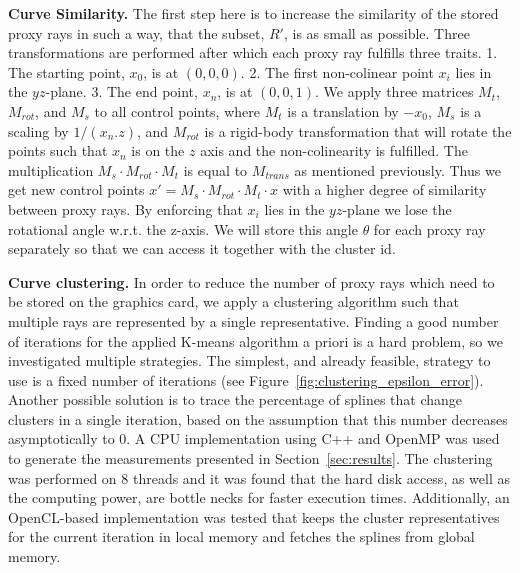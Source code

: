 \documentclass[journal]{vgtc}                %
\begin{document}
\noindent \textbf{Curve Similarity.} The first step here is to increase the similarity of the stored proxy rays in such a way, that the subset, $R'$, is as small as possible. Three transformations are performed after which each proxy ray fulfills three traits. 1. The starting point, $x_0$, is at $(0,0,0)$. 2. The first non-colinear point $x_i$ lies in the $yz$-plane. 3. The end point, $x_n$, is at $(0,0,1)$. We apply three matrices $M_t$, $M_{rot}$, and $M_s$ to all control points, where $M_t$ is a translation by $-x_0$, $M_s$ is a scaling by $1 / (x_n.z)$, and $M_{rot}$ is a rigid-body transformation that will rotate the points such that $x_n$ is on the $z$ axis and the non-colinearity is fulfilled. The multiplication $M_s \cdot M_{rot} \cdot M_t$ is equal to $M_{trans}$ as mentioned previously. Thus we get new control points $x' = M_s \cdot M_{rot} \cdot M_t \cdot x$ with a higher degree of similarity between proxy rays. By enforcing that $x_i$ lies in the $yz$-plane we lose the rotational angle w.r.t. the z-axis. We will store this angle $\theta$ for each proxy ray separately so that we can access it together with the cluster id.

\noindent \textbf{Curve clustering.} In order to reduce the number of proxy rays which need to be stored on the graphics card, we apply a clustering algorithm such that multiple rays are represented by a single representative. Finding a good number of iterations for the applied K-means algorithm a priori is a hard problem, so we investigated multiple strategies. The simplest, and already feasible, strategy to use is a fixed number of iterations (see Figure~\ref{fig:clustering_epsilon_error}). Another possible solution is to trace the percentage of splines that change clusters in a single iteration, based on the assumption that this number decreases asymptotically to 0. A CPU implementation using C++ and OpenMP was used to generate the measurements presented in Section~\ref{sec:results}. The clustering was performed on 8 threads and it was found that the hard disk access, as well as the computing power, are bottle necks for faster execution times. Additionally, an OpenCL-based implementation was tested that keeps the cluster representatives for the current iteration in local memory and fetches the splines from global memory.
\end{document}

